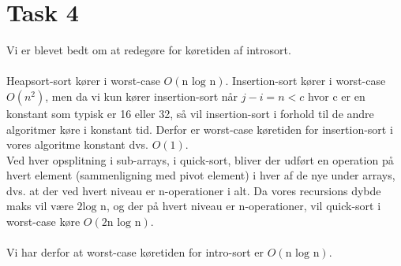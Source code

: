 \section{Task 4}
Vi er blevet bedt om at redegøre for køretiden af introsort.\\\\
Heapsort-sort kører i worst-case $O(\text{n log n})$. Insertion-sort kører i worst-case $O(n^2)$, men da vi kun kører insertion-sort når $j-i = n < c$ hvor c er en konstant som typisk er 16 eller 32, så vil insertion-sort i forhold til de andre algoritmer køre i konstant tid. Derfor er worst-case køretiden for insertion-sort i vores algoritme konstant dvs. $O(1)$.\\
Ved hver opsplitning i sub-arrays, i quick-sort, bliver der udført en operation på hvert element (sammenligning med pivot element) i hver af de nye under arrays, dvs. at der ved hvert niveau er n-operationer i alt. Da vores recursions dybde maks vil være $2 \text{log n}$, og der på hvert niveau er n-operationer, vil quick-sort i worst-case køre $O(2\text{n log n})$.\\\\
Vi har derfor at worst-case køretiden for intro-sort er $O(\text{n log n})$.